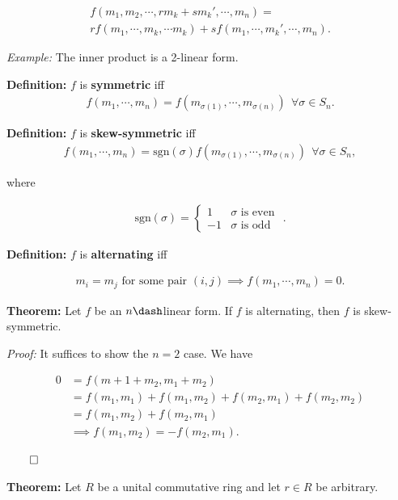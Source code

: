 \begin{align*}
f(
m_1, m_2, \cdots, rm_k + sm_k', \cdots, m_n
) = \\
r f(
    m_1, \cdots, m_k, \cdots m_k) + sf(m_1, \cdots, m_k', \cdots, m_n
)
.\end{align*}

\emph{Example:} The inner product is a 2-linear form.

\textbf{Definition:} \(f\) is \textbf{symmetric} iff
\begin{align*}
f(m_1, \cdots, m_n) = f(m_{\sigma(1)}, \cdots, m_{\sigma(n)}) ~~\forall \sigma \in S_n
.\end{align*}

\textbf{Definition:} \(f\) is \textbf{skew-symmetric} iff
\begin{align*}
f(m_1, \cdots, m_n) = \mathrm{sgn}(\sigma) f(m_{\sigma(1)}, \cdots, m_{\sigma(n)}) ~~\forall \sigma \in S_n
,\end{align*}

where

\begin{align*}
\mathrm{sgn}(\sigma) =
\begin{cases}
1 & \sigma \text{ is even } \\
-1 & \sigma \text{ is odd }
\end{cases}
.\end{align*}

\textbf{Definition:} \(f\) is \textbf{alternating} iff

\begin{align*}
m_i = m_j \text{ for some pair } (i, j) \implies f(m_1, \cdots, m_n) = 0
.\end{align*}

\textbf{Theorem:} Let \(f\) be an \(n\dash\)linear form. If \(f\) is
alternating, then \(f\) is skew-symmetric.

\emph{Proof:} It suffices to show the \(n=2\) case. We have

\begin{align*}
0
&= f(m+1 + m_2, m_1 + m_2) \\
&= f(m_1, m_1) + f(m_1, m_2) + f(m_2, m_1) + f(m_2, m_2) \\
&= f(m_1, m_2) + f(m_2, m_1)\\
&\implies f(m_1, m_2) = - f(m_2, m_1)
.\end{align*}

\(\qed\)

\textbf{Theorem:} Let \(R\) be a unital commutative ring and let
\(r\in R\) be arbitrary.

